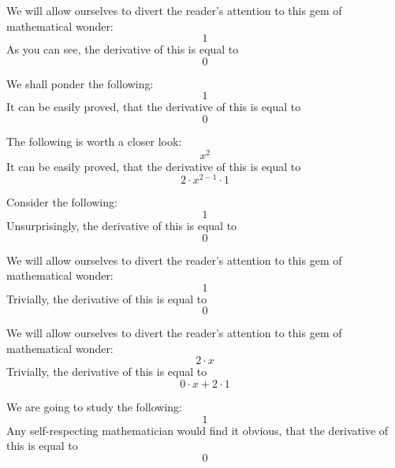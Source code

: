 \documentclass{article}
\begin{document}
We will allow ourselves to divert the reader's attention to this gem of mathematical wonder:
\begin{equation}
1 
\end{equation}
As you can see, the derivative of this is equal to
\begin{equation}
0 
\end{equation}

We shall ponder the following:
\begin{equation}
1 
\end{equation}
It can be easily proved, that the derivative of this is equal to
\begin{equation}
0 
\end{equation}

The following is worth a closer look:
\begin{equation}
x ^{2 } 
\end{equation}
It can be easily proved, that the derivative of this is equal to
\begin{equation}
2 \cdot x ^{2 - 1 } \cdot 1 
\end{equation}

Consider the following:
\begin{equation}
1 
\end{equation}
Unsurprisingly, the derivative of this is equal to
\begin{equation}
0 
\end{equation}

We will allow ourselves to divert the reader's attention to this gem of mathematical wonder:
\begin{equation}
1 
\end{equation}
Trivially, the derivative of this is equal to
\begin{equation}
0 
\end{equation}

We will allow ourselves to divert the reader's attention to this gem of mathematical wonder:
\begin{equation}
2 \cdot x 
\end{equation}
Trivially, the derivative of this is equal to
\begin{equation}
0 \cdot x + 2 \cdot 1 
\end{equation}

We are going to study the following:
\begin{equation}
1 
\end{equation}
Any self-respecting mathematician would find it obvious, that the derivative of this is equal to
\begin{equation}
0 
\end{equation}
\end{document}
